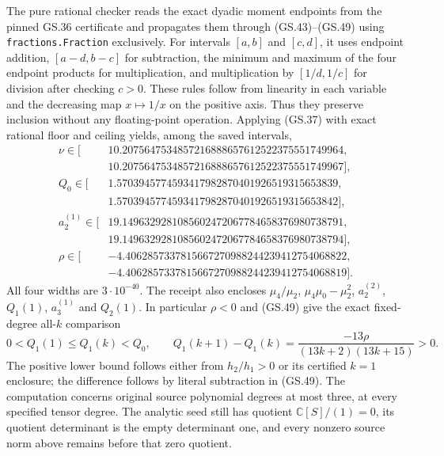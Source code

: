 The pure rational checker reads the exact dyadic moment endpoints
from the pinned GS.36 certificate and propagates them through
(GS.43)--(GS.49) using \texttt{fractions.Fraction} exclusively.
For intervals $[a,b]$ and $[c,d]$, it uses endpoint addition,
$[a-d,b-c]$ for subtraction, the minimum and maximum of the four
endpoint products for multiplication, and multiplication by
$[1/d,1/c]$ for division after checking $c>0$. These rules follow
from linearity in each variable and the decreasing map $x\mapsto1/x$
on the positive axis. Thus they preserve inclusion without any
floating-point operation. Applying (GS.37) with exact rational
floor and ceiling yields, among the saved intervals,
\begin{align*}
 \nu\in[&10.2075647534857216888657612522375551749964,\\[-2pt]
         &10.2075647534857216888657612522375551749967],\\
 Q_0\in[&1.5703945774593417982870401926519315653839,\\[-2pt]
         &1.5703945774593417982870401926519315653842],\\
 a_2^{(1)}\in[&19.1496329281085602472067784658376980738791,\\[-2pt]
               &19.1496329281085602472067784658376980738794],\\
 \rho\in[&-4.4062857337815667270988244239412754068822,\\[-2pt]
          &-4.4062857337815667270988244239412754068819].
\end{align*}
All four widths are $3\cdot10^{-40}$. The receipt also encloses
$\mu_4/\mu_2$, $\mu_4\mu_0-\mu_2^2$, $a_2^{(2)}$, $Q_1(1)$,
$a_3^{(1)}$ and $Q_2(1)$. In particular $\rho<0$ and (GS.49)
give the exact fixed-degree all-$k$ comparison
\begin{equation}
 0<Q_1(1)\le Q_1(k)<Q_0,\qquad
 Q_1(k+1)-Q_1(k)=\frac{-13\rho}{(13k+2)(13k+15)}>0.
 \tag{GS.50}
\end{equation}
The positive lower bound follows either from $h_2/h_1>0$ or its
certified $k=1$ enclosure; the difference follows by literal
subtraction in (GS.49). The computation concerns original source
polynomial degrees at most three, at every specified tensor degree.
The analytic seed still has quotient $\mathbb C[S]/(1)=0$, its
quotient determinant is the empty determinant one, and every
nonzero source norm above remains before that zero quotient.
\endgroup
